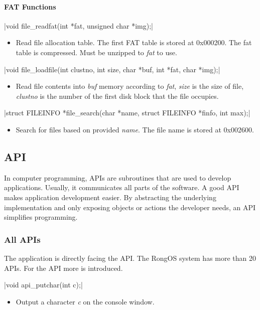 \documentclass{swfcthesis}
\begin{document}
\paragraph{FAT Functions}

\csingle|void file_readfat(int *fat, unsigned char *img);|
\begin{itemize}
\item Read file allocation table. The first FAT table is stored at 0x000200. The fat table
  is compressed. Must be unzipped to \emph{fat} to use. 
  
\end{itemize}

\csingle|void file_loadfile(int clustno, int size, char *buf, int *fat, char *img);|
\begin{itemize}
\item Read file contents into \emph{buf} memory according to \emph{fat}, \emph{size} is
  the size of file, \emph{clustno} is the number of the first disk block that the file
  occupies.
    
\end{itemize}

\csingle|struct FILEINFO *file_search(char *name, struct FILEINFO *finfo, int max);|
\begin{itemize}
\item Search for files based on provided \emph{name}. The file name is stored at 0x002600.
\end{itemize}

\subsection{API}
\label{sec:api}
In computer programming, APIs are subroutines that are used to develop
applications. Usually, it communicates all parts of the software. A good API makes
application development easier. By abstracting the underlying implementation and only
exposing objects or actions the developer needs, an API simplifies programming.

\subsubsection{All APIs}
\label{sec:all-apis}
The application is directly facing the API. The RongOS system has more than 20 APIs.
For the API more is introduced.


\csingle|void api_putchar(int c);|
\begin{itemize}
\item Output a character \emph{c} on the console window.
\end{itemize}
\end{document}
